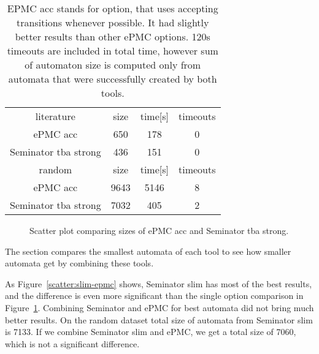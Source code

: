 \documentclass[
	digital,
nolof, nolot
]{fithesis3}
\newcommand{\hlineny}{\hline}
\begin{document}
	\begin{table}[ht]
		\centering
		
		\caption{EPMC acc stands for option, that uses accepting transitions whenever possible. It had slightly better results than other ePMC options. 120s timeouts are included in total time, however sum of automaton size is computed only from automata that were successfully created by both tools. }
		\label{table:epmc-seminator-1}
		\begin{tabular}{ |c||c|c|c| } 
			\hline
			literature&size&time[s]&timeouts\\
			\hhline{|====|}
			ePMC acc&650 &178&0 \\
			\hline
			Seminator tba strong &436 &151&0 \\
			\hlineny
			\hline
			random&size&time[s]&timeouts\\
			\hhline{|====|}
			ePMC acc&9643 & 5146&8\\
			\hline
			Seminator tba strong &7032 &405&2 \\
			\hlineny
		\end{tabular}
	\end{table}
	\begin{figure}[ht]
		\centering
		
		\caption{Scatter plot comparing sizes of ePMC acc and Seminator tba strong.}
		\label{scatter:slim-epmc-1}
		\begin{tikzpicture}
			
		\end{tikzpicture}
	\end{figure}
	
	
		The section compares the smallest automata of each tool to see how smaller automata get by combining these tools.
		
		As Figure~\ref{scatter:slim-epmc} shows, Seminator slim has most of the best results, and the difference is even more significant than the single option comparison in Figure~\ref{scatter:slim-epmc-1}. Combining Seminator and ePMC for best automata did not bring much better results. On the random dataset total size of automata from Seminator slim is 7133. If we combine Seminator slim and ePMC, we get a total size of 7060, which is not a significant difference.
	
\end{document}
